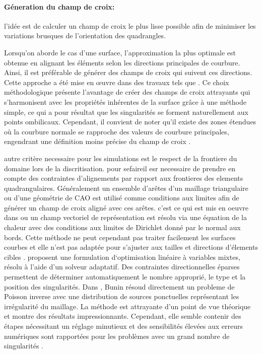 \paragraph{Géneration du champ de croix:} l'idée est de calculer un champ de croix le plus lisse possible afin de minimiser les variations brusques de l'orientation des quadrangles. 

Lorsqu'on aborde le cas d'une surface, l'approximation la plus optimale est obtenue en alignant les éléments selon les directions principales de courbure. Ainsi, il est préférable de générer des champs de croix qui suivent ces directions. Cette approche a été mise en œuvre dans des travaux tels que \cite{alliez2003anisotropic, marinov2004direct, kalberer2007quadcover}. Ce choix méthodologique présente l'avantage de créer des champs de croix attrayants qui s'harmonisent avec les propriétés inhérentes de la surface grâce à une méthode simple, ce qui a pour résultat que les singularités se forment naturellement aux points ombilicaux. Cependant, il convient de noter qu'il existe des zones étendues où la courbure normale se rapproche des valeurs de courbure principales, engendrant une définition moins précise du champ de croix \cite{fogg2015automatic}.

autre critère necessaire pour les simulations est le respect de la frontiere du domaine lors de la discritisation. pour sefaireil esr necessaire de prendre en compte des contraintes d'alignements par rapport aux frontieres des elements quadrangulaires. Généralement un ensemble d'arêtes d'un maillage triangulaire ou d'une géométrie de CAO est utilisé comme conditions aux limites afin de générer un champ de croix aligné avec ces  arêtes. c'est ce qui est mis en oeuvre dans \cite{kowalski2013pde, palacios2007rotational} ou un champ vectoriel de représentation est résolu via une équation de la chaleur avec des conditions aux limites de Dirichlet donné par le normal aux bords. Cette méthode ne peut cependant pas traiter facilement les surfaces courbes et elle n'est pas adaptée pour s'ajuster aux tailles et directions d'élements cibles \cite{fogg2015automatic}. \cite{bommes2009mixed} proposent une formulation d`optimisation linéaire à variables mixtes, résolu à l'aide d'un solveur adaptatif. Des contraintes directionnelles éparses permettent de déterminer automatiquement le nombre approprié, le type et la position des singularités. Dans \cite{bunin2008towards}, Bunin résoud directement un probleme de Poisson inverse avec une distribution de sources ponctuelles représentant les irrégularité du maillage. La méthode est attrayante d'un point de vue théorique et montre des résultats impressionnants. Cependant, elle semble contenir des étapes nécessitant un réglage minutieux et des sensibilités élevées aux erreurs numériques sont rapportées pour les problèmes avec un grand nombre de singularités \cite{fogg2015automatic}.


